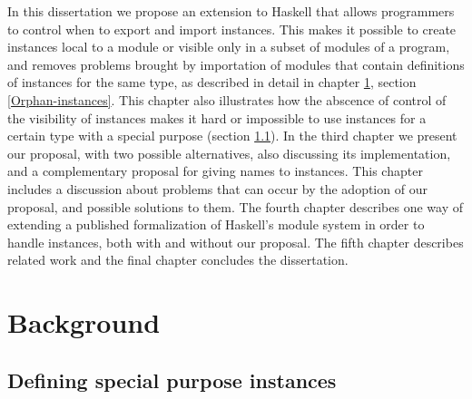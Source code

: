 \documentclass[msc]{ppgccufmg}
\begin{document}
In this dissertation we propose an extension to Haskell that
allows programmers to control when to export and import instances.
This makes it possible to create instances local to a module or
visible only in a subset of modules of a program, and removes problems
brought by importation of modules that contain definitions of
instances for the same type, as described in detail in chapter
\ref{Background}, section \ref{Orphan-instances}.  This chapter
also illustrates how the abscence of control of the visibility of
instances makes it hard or impossible to use instances for a certain
type with a special purpose (section
\ref{Special-purpose-instances}). In the third chapter we present our
proposal, with two possible alternatives, also discussing its
implementation, and a complementary proposal for giving names to
instances.  This chapter includes a discussion about problems that can
occur by the adoption of our proposal, and possible solutions to them.
The fourth chapter describes one way of extending a published
formalization of Haskell's module system \citep{formal} in order to
handle instances, both with and without our proposal. The fifth
chapter describes related work and the final chapter concludes the
dissertation.

\chapter{Background}
\label{Background}

\section{Defining special purpose instances}
\label{Special-purpose-instances}
\end{document}
